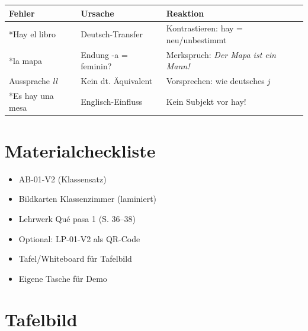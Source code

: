 \documentclass[11pt,a4paper]{article}
\begin{document}
\begin{tabular}{|p{4cm}|p{4cm}|p{5cm}|}
\hline
\textbf{Fehler} & \textbf{Ursache} & \textbf{Reaktion} \\
\hline
*Hay el libro & Deutsch-Transfer & Kontrastieren: hay = neu/unbestimmt \\
\hline
*la mapa & Endung -a = feminin? & Merkspruch: \textit{Der Mapa ist ein Mann!} \\
\hline
Aussprache \textit{ll} & Kein dt. Äquivalent & Vorsprechen: wie deutsches \textit{j} \\
\hline
*Es hay una mesa & Englisch-Einfluss & Kein Subjekt vor hay! \\
\hline
\end{tabular}

\vspace{0.5cm}

\section*{Materialcheckliste}

\begin{itemize}[nosep]
    \item[$\square$] AB-01-V2 (Klassensatz)
    \item[$\square$] Bildkarten Klassenzimmer (laminiert)
    \item[$\square$] Lehrwerk Qué pasa 1 (S. 36--38)
    \item[$\square$] Optional: LP-01-V2 als QR-Code
    \item[$\square$] Tafel/Whiteboard für Tafelbild
    \item[$\square$] Eigene Tasche für Demo
\end{itemize}

\vspace{0.5cm}

\section*{Tafelbild}
\end{document}
